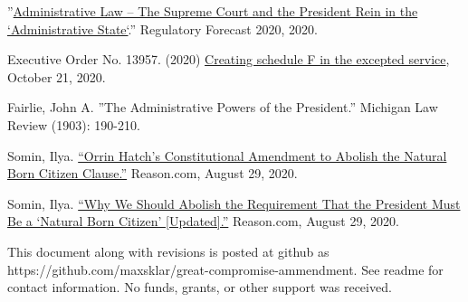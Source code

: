 \documentclass{article}
\begin{document}
\begin{thebibliography}{20}
”\href{https://www.crowell.com/a/web/bomv5ATK9LZPNrBA51skWq/4TtiyY/Regulatory-Forecast-2020-Administrative-Law-Crowell-Moring.pdf }{Administrative Law – The Supreme Court and the President Rein in the `Administrative State`}.” Regulatory Forecast 2020, 2020. 

Executive Order No. 13957. (2020) \href{https://www.
federalregister.gov/documents/2020/10/26/2020-23780/creating-schedule-f-in-the-excepted-service}{Creating schedule F in the excepted service}, October 21, 2020.

Fairlie, John A. ”The Administrative Powers of the President.” Michigan Law Review (1903): 190-210.

Somin, Ilya. \href{https://reason.com/volokh/2020/08/16/orrin-hatchs-constitutional-amendment-to-abolish-the-natural-born-citizen-clause/}{“Orrin Hatch’s Constitutional Amendment to Abolish the Natural Born Citizen Clause.”} Reason.com, August 29, 2020.

Somin, Ilya. \href{https://reason.com/volokh/2020/08/14/why-we-should-abolish-the-requirement-that-the-president-must-be-a-natural-born-citizen/}{“Why We Should Abolish the Requirement That the President Must Be a ‘Natural Born Citizen’ [Updated].”} Reason.com, August 29, 2020. 

\end{thebibliography}

This document along with revisions is posted at github as https://github.com/maxsklar/great-compromise-ammendment. See readme for contact information. No funds, grants, or other support was received.
\end{document}
